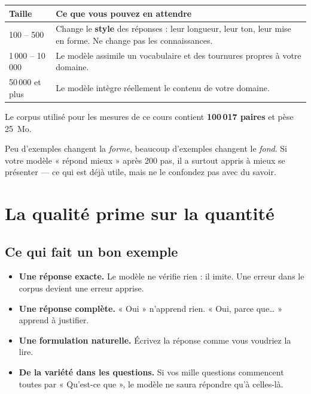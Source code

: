 \begin{center}
\begin{tabular}{lp{9.2cm}}
\toprule
\textbf{Taille} & \textbf{Ce que vous pouvez en attendre} \\
\midrule
100 -- 500 & Change le \textbf{style} des réponses : leur longueur, leur ton,
             leur mise en forme. Ne change pas les connaissances. \\
1\,000 -- 10\,000 & Le modèle assimile un vocabulaire et des tournures propres à
             votre domaine. \\
50\,000 et plus & Le modèle intègre réellement le contenu de votre domaine. \\
\bottomrule
\end{tabular}
\end{center}

Le corpus utilisé pour les mesures de ce cours contient
\textbf{100\,017 paires} et pèse 25~Mo.

\begin{nkretenir}
Peu d'exemples changent la \emph{forme}, beaucoup d'exemples changent le
\emph{fond}. Si votre modèle « répond mieux » après 200 pas, il a surtout appris
à mieux se présenter — ce qui est déjà utile, mais ne le confondez pas avec du
savoir.
\end{nkretenir}

\section{La qualité prime sur la quantité}

\subsection{Ce qui fait un bon exemple}

\begin{itemize}
  \item \textbf{Une réponse exacte.} Le modèle ne vérifie rien : il imite. Une
        erreur dans le corpus devient une erreur apprise.
  \item \textbf{Une réponse complète.} « Oui » n'apprend rien. « Oui, parce
        que… » apprend à justifier.
  \item \textbf{Une formulation naturelle.} Écrivez la réponse comme vous
        voudriez la lire.
  \item \textbf{De la variété dans les questions.} Si vos mille questions
        commencent toutes par « Qu'est-ce que », le modèle ne saura répondre
        qu'à celles-là.
\end{itemize}

